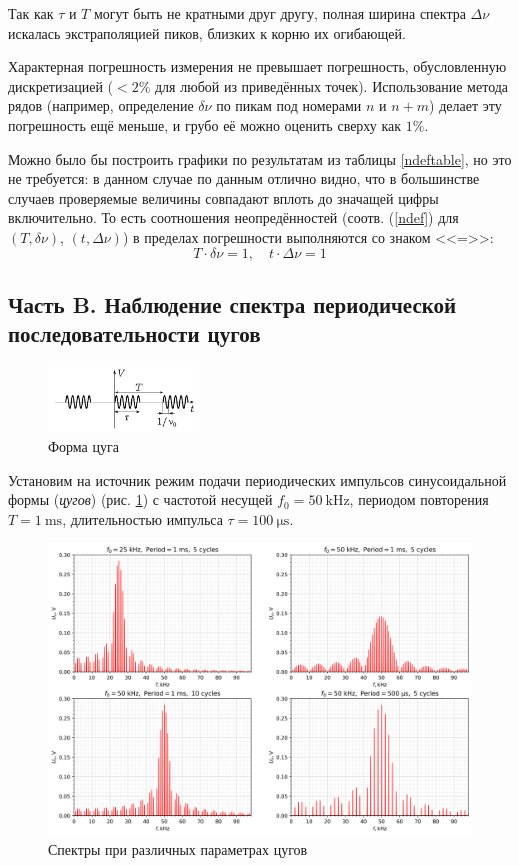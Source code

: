 \documentclass[12pt, a4paper]{article}
\begin{document}
Так как $\tau$ и $T$ могут быть не кратными друг другу, полная ширина спектра $\Delta \nu$ искалась экстраполяцией пиков, близких к корню их огибающей.

Характерная погрешность измерения не превышает погрешность, обусловленную дискретизацией ($<2\%$ для любой из приведённых точек). Использование метода рядов (например, определение $\delta \nu$ по пикам под номерами $n$ и $n+m$) делает эту погрешность ещё меньше, и грубо её можно оценить сверху как $1\%$.

Можно было бы построить графики по результатам из таблицы \ref{ndeftable}, но это не требуется: в данном случае по данным отлично видно, что в большинстве случаев проверяемые величины совпадают вплоть до значащей цифры включительно. То есть соотношения неопредённостей (соотв. (\ref{ndef}) для $(T, \delta \nu)$, $(t, \Delta \nu)$) в пределах погрешности выполняются со знаком <<=>>:
$$T\cdot \delta \nu = 1, \quad t \cdot \Delta \nu = 1$$

\subsection{Часть B. Наблюдение спектра периодической последовательности цугов}
\begin{figure}\vspace{-12mm}
  \centering
  \includegraphics[width=4cm]{pics/zug}
  \caption{Форма цуга}
  \label{zug}
\end{figure}
Установим на источник режим подачи периодических импульсов синусоидальной формы (\textit{цугов}) (рис. \ref{zug}) с частотой несущей $f_0 = 50~\mathrm{kHz}$, периодом повторения $T = 1~\mathrm{ms}$, длительностью импульса $\tau = 100~\mathrm{\mu s}$.

\vspace{3mm}
\begin{figure}[H]
  \centering
  \includegraphics[width = 0.8\linewidth]{pics/B_4spectra}
  \caption{Спектры при различных параметрах цугов}
  \label{b4spectra}
\end{figure}
\end{document}
